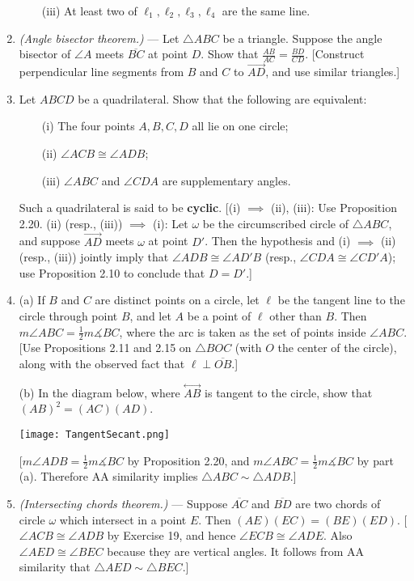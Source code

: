 \documentclass[leqno]{book}
\begin{document}
\begin{enumerate}
~~~~(iii) At least two of $\ell_1,\ell_2,\ell_3,\ell_4$ are the same line.

\item\emph{(Angle bisector theorem.)} \---- Let $\triangle ABC$ be a triangle.  Suppose the angle bisector of $\angle A$ meets $\overline{BC}$ at point $D$.  Show that $\frac{AB}{AC}=\frac{BD}{CD}$.  [Construct perpendicular line segments from $B$ and $C$ to $\overset{\longrightarrow}{AD}$, and use similar triangles.]

\item Let $ABCD$ be a quadrilateral.  Show that the following are equivalent:

~~~~(i) The four points $A,B,C,D$ all lie on one circle;

~~~~(ii) $\angle ACB\cong\angle ADB$;

~~~~(iii) $\angle ABC$ and $\angle CDA$ are supplementary angles.

Such a quadrilateral is said to be \textbf{cyclic}.  [(i) $\implies$ (ii), (iii): Use Proposition 2.20.  (ii) (resp., (iii)) $\implies$ (i): Let $\omega$ be the circumscribed circle of $\triangle ABC$, and suppose $\overset{\longrightarrow}{AD}$ meets $\omega$ at point $D'$.  Then the hypothesis and (i) $\implies$ (ii) (resp., (iii)) jointly imply that $\angle ADB\cong\angle AD'B$ (resp., $\angle CDA\cong\angle CD'A$); use Proposition 2.10 to conclude that $D=D'$.]

\item (a) If $B$ and $C$ are distinct points on a circle, let $\ell$ be the tangent line to the circle through point $B$, and let $A$ be a point of $\ell$ other than $B$.  Then $m\angle ABC=\frac 12m\measuredangle BC$, where the arc is taken as the set of points inside $\angle ABC$.  [Use Propositions 2.11 and 2.15 on $\triangle BOC$ (with $O$ the center of the circle), along with the observed fact that $\ell\perp\overline{OB}$.]

(b) In the diagram below, where $\overset{\longleftrightarrow}{AB}$ is tangent to the circle, show that $(AB)^2=(AC)(AD)$.
\begin{center}\texttt{[image: TangentSecant.png]}\end{center}
[$m\angle ADB=\frac 12m\measuredangle BC$ by Proposition 2.20, and $m\angle ABC=\frac 12m\measuredangle BC$ by part (a).  Therefore AA similarity implies $\triangle ABC\sim\triangle ADB$.]

\item\emph{(Intersecting chords theorem.)} \---- Suppose $\overline{AC}$ and $\overline{BD}$ are two chords of circle $\omega$ which intersect in a point $E$.  Then $(AE)(EC)=(BE)(ED)$.  [$\angle ACB\cong\angle ADB$ by Exercise 19, and hence $\angle ECB\cong\angle ADE$.  Also $\angle AED\cong\angle BEC$ because they are vertical angles.  It follows from AA similarity that $\triangle AED\sim\triangle BEC$.]


\end{enumerate}
\end{document}
